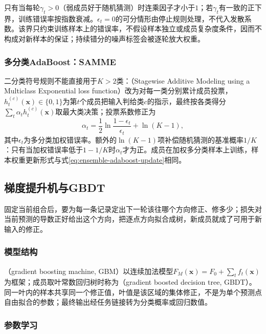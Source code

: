 只有当每轮$\gamma_t>0$（弱成员好于随机猜测）时连乘因子才小于$1$；若$\gamma_t$有一致的正下界，训练错误率按指数衰减。$\epsilon_t=0$的可分情形由停止规则处理，不代入发散系数。该界只约束训练样本上的错误率，不假设样本独立或成员复杂度条件，因而不构成对新样本的保证；持续错分的噪声标签会被逐轮放大权重。

\subsubsection{多分类AdaBoost：SAMME}
\label{sec:ensemble-adaboost-multiclass}
二分类符号规则不能直接用于$K>2$类：（Stagewise Additive Modeling using a Multiclass Exponential loss function）改为对每一类分别累计成员投票，$h_t^{(c)}(\bm x)\in\{0,1\}$为第$t$个成员把输入判给类$c$的指示，最终按各类得分$\sum_t\alpha_t h_t^{(c)}(\bm x)$取最大类决策；投票系数修正为
\begin{equation}
  \alpha_t=\frac12\ln\frac{1-\epsilon_t}{\epsilon_t}+\ln(K-1),
  \label{eq:ensemble-samme-alpha}
\end{equation}
其中$\epsilon_t$为多分类加权错误率。额外的$\ln(K-1)$项补偿随机猜测的基准概率$1/K$：只有当加权错误率低于$1-1/K$时$\alpha_t$才为正。成员在加权多分类样本上训练，样本权重更新形式与式\eqref{eq:ensemble-adaboost-update}相同。

\subsection{梯度提升机与GBDT}
\label{sec:ensemble-gradient-boosting}

固定当前组合后，要为每一条记录定出下一轮该往哪个方向修正、修多少；损失对当前预测的导数正好给出这个方向，把逐点方向拟合成树，新成员就成了可用于新输入的修正。

\subsubsection{模型结构}
（gradient boosting machine, GBM）以连续加法模型$F_M(\bm x)=F_0+\sum_t f_t(\bm x)$为框架；成员取叶常数回归树时称为（gradient boosted decision tree, GBDT）。同一叶内的样本共享同一个修正值，叶值是该区域的集体修正，不是为单个预测点自由拟合的参数；最终输出经任务链接转为分类概率或回归数值。

\subsubsection{参数学习}

